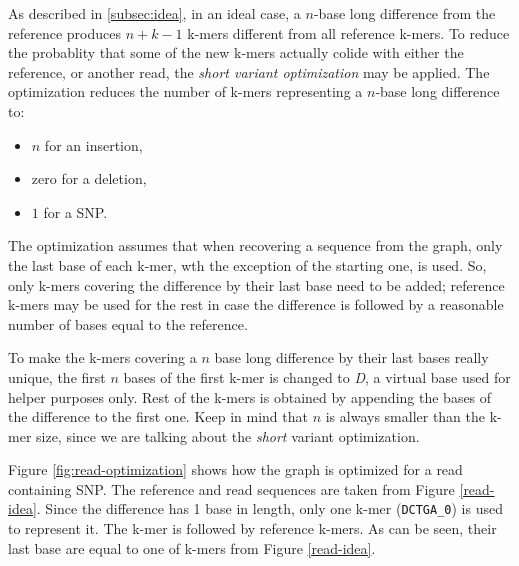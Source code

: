 As described in \ref{subsec:idea}, in an ideal case, a $n$-base long difference from the reference produces $n + k - 1$ k-mers different from all reference k-mers. To reduce the probablity that some of the new k-mers actually colide with either the reference, or another read, the \textit{short variant optimization} may be applied. The optimization reduces the number of k-mers representing a $n$-base long difference to:
\begin{itemize}
\item $n$ for an insertion,
\item zero for a deletion,
\item $1$ for a SNP.
\end{itemize}
The optimization assumes that when recovering a sequence from the graph, only the last base of each k-mer, wth the exception of the starting one, is used. So, only k-mers covering the difference by their last base need to be added; reference k-mers may be used for the rest in case the difference is followed by a reasonable number of bases equal to the reference. 

To make the k-mers covering a $n$ base long difference by their last bases really unique, the first $n$ bases of the first k-mer is changed to \textit{D}, a virtual base used for helper purposes only. Rest of the k-mers is obtained by appending the bases of the difference to the first one. Keep in mind that $n$ is always smaller than the k-mer size, since we are talking about the \textit{short} variant optimization.

Figure \ref{fig:read-optimization} shows how the graph is optimized for a read containing SNP. The reference and read sequences are taken from Figure \ref{read-idea}. Since the difference has 1 base in length, only one k-mer (\texttt{DCTGA\_0}) is used to represent it. The k-mer is followed by reference k-mers. As can be seen, their last base are equal to one of k-mers from Figure \ref{read-idea}.

